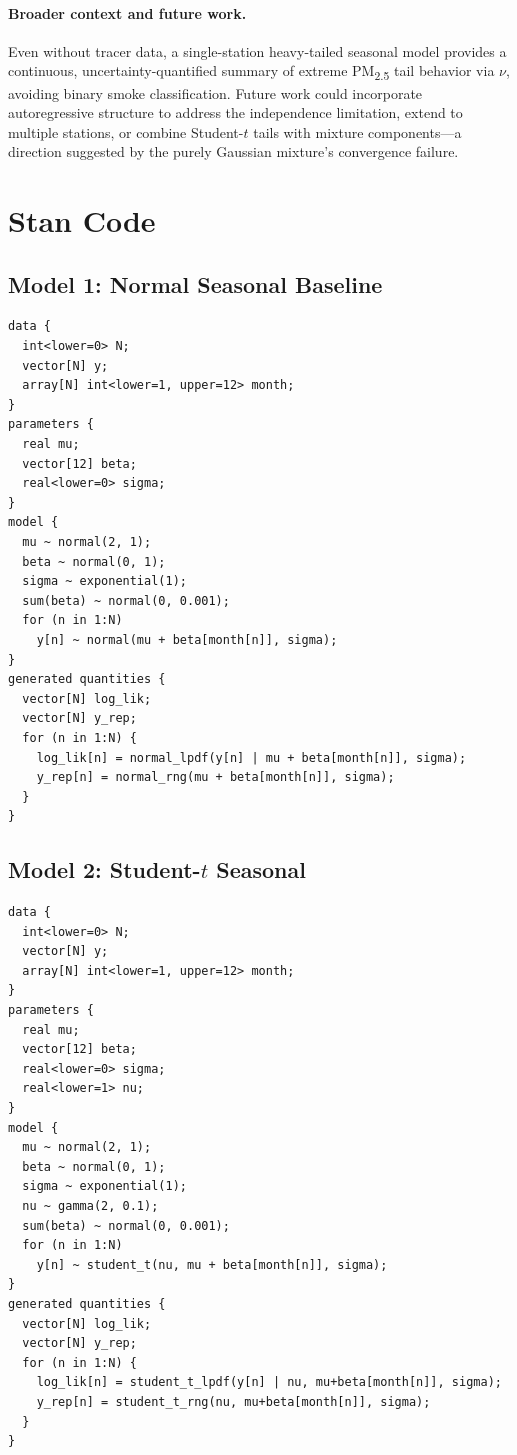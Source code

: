 \documentclass[10pt]{article}
\begin{document}
\paragraph{Broader context and future work.} Even without tracer data, a single-station heavy-tailed seasonal model provides a continuous, uncertainty-quantified summary of extreme PM\textsubscript{2.5} tail behavior via $\nu$, avoiding binary smoke classification. Future work could incorporate autoregressive structure to address the independence limitation, extend to multiple stations, or combine Student-$t$ tails with mixture components---a direction suggested by the purely Gaussian mixture's convergence failure.

\newpage




\newpage
\appendix


\section{Stan Code}\label{app:stan}

\subsection*{Model 1: Normal Seasonal Baseline}
\begin{verbatim}
data {
  int<lower=0> N;
  vector[N] y;
  array[N] int<lower=1, upper=12> month;
}
parameters {
  real mu;
  vector[12] beta;
  real<lower=0> sigma;
}
model {
  mu ~ normal(2, 1);
  beta ~ normal(0, 1);
  sigma ~ exponential(1);
  sum(beta) ~ normal(0, 0.001);
  for (n in 1:N)
    y[n] ~ normal(mu + beta[month[n]], sigma);
}
generated quantities {
  vector[N] log_lik;
  vector[N] y_rep;
  for (n in 1:N) {
    log_lik[n] = normal_lpdf(y[n] | mu + beta[month[n]], sigma);
    y_rep[n] = normal_rng(mu + beta[month[n]], sigma);
  }
}
\end{verbatim}

\subsection*{Model 2: Student-$t$ Seasonal}
\begin{verbatim}
data {
  int<lower=0> N;
  vector[N] y;
  array[N] int<lower=1, upper=12> month;
}
parameters {
  real mu;
  vector[12] beta;
  real<lower=0> sigma;
  real<lower=1> nu;
}
model {
  mu ~ normal(2, 1);
  beta ~ normal(0, 1);
  sigma ~ exponential(1);
  nu ~ gamma(2, 0.1);
  sum(beta) ~ normal(0, 0.001);
  for (n in 1:N)
    y[n] ~ student_t(nu, mu + beta[month[n]], sigma);
}
generated quantities {
  vector[N] log_lik;
  vector[N] y_rep;
  for (n in 1:N) {
    log_lik[n] = student_t_lpdf(y[n] | nu, mu+beta[month[n]], sigma);
    y_rep[n] = student_t_rng(nu, mu+beta[month[n]], sigma);
  }
}
\end{verbatim}
\end{document}
